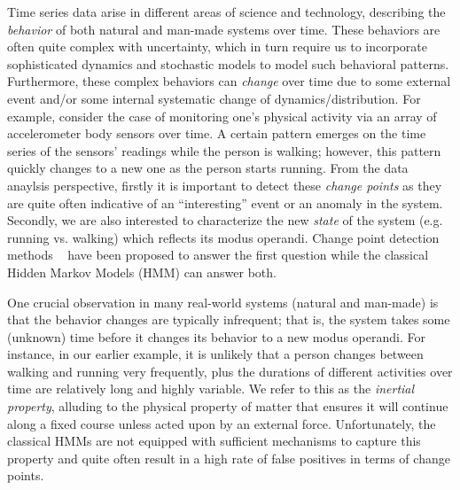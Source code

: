 Time series data arise in different areas of science and technology, describing
the \emph{behavior} of both natural and man-made systems over time. These
behaviors are often quite complex with uncertainty, which in turn require us to
incorporate sophisticated dynamics and stochastic models to model such
behavioral patterns. Furthermore, these complex behaviors can
\emph{change} over time due to some external event and/or some internal
systematic change of dynamics/distribution. For example, consider the case of
monitoring one's physical activity via an array of accelerometer body sensors
over time. A certain pattern emerges on the time series of the sensors' readings
while the person is walking; however, this pattern quickly changes to a new one
as the person starts running. From the data anaylsis perspective, firstly it is
important to detect these \emph{change points} as they are quite often
indicative of an ``interesting'' event or an anomaly in the system. Secondly, we
are also interested to characterize the new \emph{state} of the system (e.g. running vs.
walking) which reflects its modus operandi. Change point detection methods ~\cite{} have been proposed
to answer the first question while the classical Hidden Markov Models (HMM) can
answer both.

One crucial observation in many real-world systems (natural and man-made) is
that the behavior changes are typically infrequent; that is, the system takes some
(unknown) time before it changes its behavior to a new modus operandi. For
instance, in our earlier example, it is unlikely that a person changes between
walking and running very frequently, plus the durations of different activities
over time are relatively long and highly variable. We refer to this as the
\emph{inertial property}, alluding to the physical property of matter that ensures it will continue along
a fixed course unless acted upon by an external force. Unfortunately,
the classical HMMs are not equipped with sufficient mechanisms to capture this
property and quite often result in a high rate of false positives in terms of
change points. 
